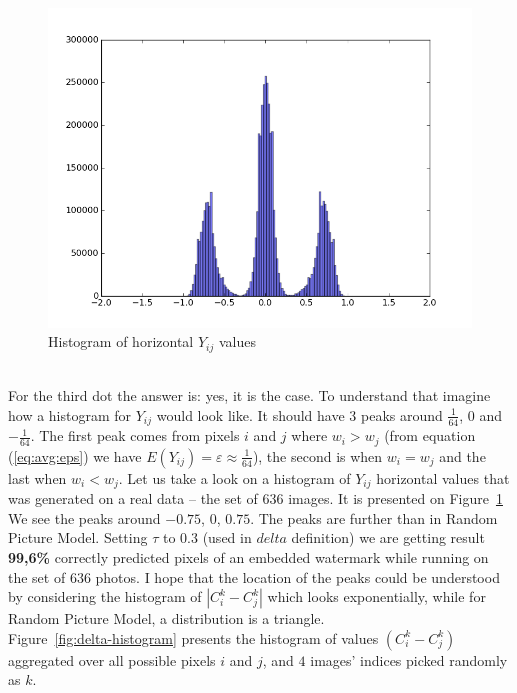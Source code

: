 \documentclass[a4paper,12pt]{article}
\begin{document}
\begin{figure}[ht]
  \centering
    \includegraphics[width=1.0\textwidth]{../../images/histograms/hori.png}
  \caption{Histogram of horizontal $Y_{ij}$ values}
  \label{hist:hori-y}
\end{figure}\\
For the third dot the answer is: yes, it is the case. To understand that imagine
how a histogram for $Y_{ij}$ would look like. It should have $3$ peaks
around $\frac{1}{64}$, $0$ and $-\frac{1}{64}$. The first peak comes from pixels
$i$ and $j$ where $w_i > w_j$
(from equation (\ref{eq:avg:eps}) we have
$E(Y_{ij}) = \varepsilon \approx \frac{1}{64}$), the second is
when $w_i = w_j$ and the last when $w_i < w_j$. Let us take a look on
a histogram of $Y_{ij}$ horizontal values that was generated on a real data --
the set of 636 images. It is presented on Figure~\ref{hist:hori-y}
We see the peaks around $-0.75$, $0$, $0.75$. The peaks are further than in
Random Picture Model. Setting $\tau$ to $0.3$ (used in $delta$ definition) we
are getting result \textbf{99,6\%} correctly predicted pixels of an embedded
watermark while running on the set of 636 photos. I hope that the location of
the peaks could be understood by considering the histogram of $|C^k_i - C^k_j|$
which looks exponentially, while for Random Picture Model, a distribution is
a triangle.\\
Figure~\ref{fig:delta-histogram} presents the histogram of values
$(C^k_i - C^k_j)$ aggregated over all possible pixels $i$ and $j$, and $4$ images'
indices picked randomly as $k$.
\end{document}
